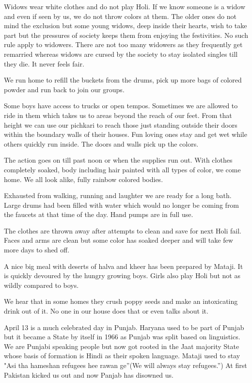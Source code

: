 Widows wear white clothes and do not play Holi. If we know someone is
a widow and even if seen by us, we do not throw colors at them. The older
ones do not mind the exclusion but some young widows, deep inside their
hearts, wish to take part but the pressures of society keeps them from
enjoying the festivities. No such rule apply to widowers. There are not
too many widowers as they frequently get remarried whereas widows are
cursed by the society to stay isolated singles till they die. It never
feels fair. 

We run home to refill the buckets from the drums, pick up more bags of
colored powder and run back to join our groups. 

Some boys have access to trucks or open tempos. Sometimes we are allowed
to ride in them which takes us to areas beyond the reach of our feet. From
that height we can use our pichkari to reach those just standing outside
their doors within the boundary walls of their houses. Fun loving ones
stay and get wet while others quickly run inside. The doors and walls pick
up the colors. 

The action goes on till past noon or when the supplies run out. With
clothes completely soaked, body including hair painted with all types of
color, we come home. We all look alike, fully rainbow colored bodies. 

Exhausted from walking, running and laughter we are ready for a long bath.
Large drums had been filled with water which would no longer be coming
from the faucets at that time of the day. Hand pumps are in full use.

The clothes are thrown away after attempts to clean and save for next Holi
fail. Faces and arms are clean but some color has soaked deeper and will
take few more days to shed off. 

A nice big meal with deserts of halva and kheer has been prepared by
Mataji. It is quickly devoured by the hungry growing boys. Girls also play
Holi but not as wildly compared to boys. 

We hear that in some homes they crush poppy seeds and make an intoxicating
drink out of it. No one in our house does that or even talks about it. 

April 13 is a much celebrated day in Punjab. Haryana used to be part of
Punjab but it became a State by itself in 1966 as Punjab was split based
on linguistics. We are Punjabi speaking people but now got rooted in the
Jaat majority State whose basis of formation is Hindi as their spoken
language. Mataji used to stay "Asi tha hameshan refugees hee rawan ge”(We
will always stay refugees.”) At first Pakistan kicked us out and now
Panjab has disowned us. 

